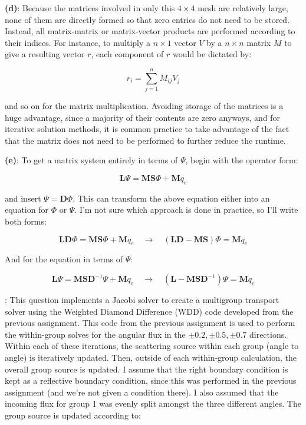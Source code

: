 \documentclass[10pt]{article}
\newcommand*\circled[1]{\tikz[baseline=(char.base)]{
            \node[shape=circle,draw,inner sep=2pt] (char) {#1};}}
\begin{document}
\textbf{(d)}: Because the matrices involved in only this \(4\times4\) mesh are relatively large, none of them are directly formed so that zero entries do not need to be stored. Instead, all matrix-matrix or matrix-vector products are performed according to their indices. For instance, to multiply a \(n\times1\) vector \(V\) by a \(n\times n\) matrix \(M\) to give a resulting vector \(r\), each component of \(r\) would be dictated by:

\begin{equation}
r_i=\sum_{j=1}^nM_{ij}V_j
\end{equation}

and so on for the matrix multiplication. Avoiding storage of the matrices is a huge advantage, since a majority of their contents are zero anyways, and for iterative solution methods, it is common practice to take advantage of the fact that the matrix does not need to be performed to further reduce the runtime.\newline

\textbf{(e)}: To get a matrix system entirely in terms of \(\Psi\), begin with the operator form:

\begin{equation}
\textbf{L}\Psi=\textbf{M}\textbf{S}\Phi+\textbf{M}q_e
\end{equation}

and insert \(\Psi=\textbf{D}\Phi\). This can transform the above equation either into an equation for \(\Phi\) or \(\Psi\). I'm not sure which approach is done in practice, so I'll write both forms:

\begin{equation}
\textbf{L}\textbf{D}\Phi=\textbf{M}\textbf{S}\Phi+\textbf{M}q_e\quad\rightarrow\quad(\textbf{L}\textbf{D}-\textbf{M}\textbf{S})\Phi=\textbf{M}q_e
\end{equation}

And for the equation in terms of \(\Psi\):

\begin{equation}
\textbf{L}\Psi=\textbf{M}\textbf{S}\textbf{D}^{-1}\Psi+\textbf{M}q_e\quad\rightarrow\quad(\textbf{L}-\textbf{M}\textbf{S}\textbf{D}^{-1})\Psi=\textbf{M}q_e
\end{equation}

\circled{2}: This question implements a Jacobi solver to create a multigroup transport solver using the Weighted Diamond Difference (WDD) code developed from the previous assignment. This code from the previous assignment is used to perform the within-group solves for the angular flux in the \(\pm0.2,\pm0.5,\pm0.7\) directions. Within each of these iterations, the scattering source within each group (angle to angle) is iteratively updated. Then, outside of each within-group calculation, the overall group source is updated. I assume that the right boundary condition is kept as a reflective boundary condition, since this was performed in the previous assignment (and we're not given a condition there). I also assumed that the incoming flux for group 1 was evenly split amongst the three different angles. The group source is updated according to:
\end{document}
